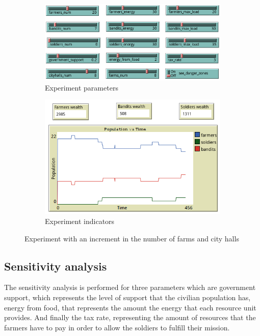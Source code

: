 \documentclass{wscpaperproc}
\begin{document}
\begin{figure}[h!]
    \begin{subfigure}{0.45\textwidth}
    \includegraphics[width=\textwidth]{Images/Exp5_sliders.png}
    \caption{Experiment parameters}
    \end{subfigure}
    \hfill
    \begin{subfigure}{0.45\textwidth}
    \includegraphics[width=\textwidth]{Images/Exp5_indicators.png}
    \caption{Experiment indicators}
    \end{subfigure}%
    \caption{Experiment with an increment in the number of farms and city halls}
    \label{more_buildings}
\end{figure}

\newpage

\subsection{Sensitivity analysis}

The sensitivity analysis is performed for three parameters which are government
support, which represents the level of support that the civilian population has,
energy from food, that represents the amount the energy that each resource unit
provides. And finally the tax rate, representing the amount of resources that
the farmers have to pay in order to allow the soldiers to fulfill their mission.
\end{document}

